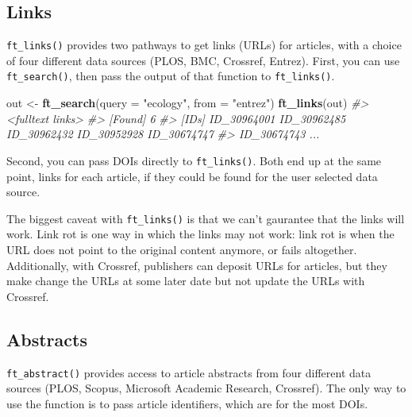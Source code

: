 \documentclass[author-year, review, 11pt]{components/elsarticle} %
\newenvironment{Shaded}{\begin{snugshade}}{\end{snugshade}}
\newcommand{\CommentTok}[1]{\textcolor[rgb]{0.56,0.35,0.01}{\textit{#1}}}
\newcommand{\DataTypeTok}[1]{\textcolor[rgb]{0.13,0.29,0.53}{#1}}
\newcommand{\KeywordTok}[1]{\textcolor[rgb]{0.13,0.29,0.53}{\textbf{#1}}}
\newcommand{\NormalTok}[1]{#1}
\newcommand{\OperatorTok}[1]{\textcolor[rgb]{0.81,0.36,0.00}{\textbf{#1}}}
\newcommand{\StringTok}[1]{\textcolor[rgb]{0.31,0.60,0.02}{#1}}
\begin{document}
\hypertarget{links}{%
\subsection{Links}\label{links}}

\texttt{ft\_links()} provides two pathways to get links (URLs) for
articles, with a choice of four different data sources (PLOS, BMC,
Crossref, Entrez). First, you can use \texttt{ft\_search()}, then pass
the output of that function to \texttt{ft\_links()}.

\begin{Shaded}
\begin{Highlighting}[]
\NormalTok{out <-}\StringTok{ }\KeywordTok{ft_search}\NormalTok{(}\DataTypeTok{query =} \StringTok{"ecology"}\NormalTok{, }\DataTypeTok{from =} \StringTok{"entrez"}\NormalTok{)}
\KeywordTok{ft_links}\NormalTok{(out)}
\CommentTok{#> <fulltext links>}
\CommentTok{#> [Found] 6 }
\CommentTok{#> [IDs] ID_30964001 ID_30962485 ID_30962432 ID_30952928 ID_30674747}
\CommentTok{#>      ID_30674743 ...}
\end{Highlighting}
\end{Shaded}

Second, you can pass DOIs directly to \texttt{ft\_links()}. Both end up
at the same point, links for each article, if they could be found for
the user selected data source.

\begin{Shaded}
\end{Shaded}

The biggest caveat with \texttt{ft\_links()} is that we can't gaurantee
that the links will work. Link rot is one way in which the links may not
work: link rot is when the URL does not point to the original content
anymore, or fails altogether. Additionally, with Crossref, publishers
can deposit URLs for articles, but they make change the URLs at some
later date but not update the URLs with Crossref.

\hypertarget{abstracts}{%
\subsection{Abstracts}\label{abstracts}}

\texttt{ft\_abstract()} provides access to article abstracts from four
different data sources (PLOS, Scopus, Microsoft Academic Research,
Crossref). The only way to use the function is to pass article
identifiers, which are for the most DOIs.
\end{document}
